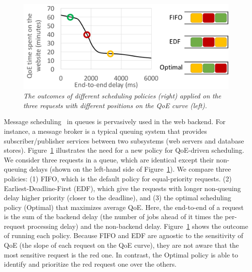 \begin{figure}
	\centering
	\includegraphics[width=1.0\textwidth]{figs/scheduling.pdf}
	\vspace{-0.6cm}
	\caption{\em The outcomes of different scheduling policies (right) applied on the three requests with different positions on the QoE curve (left).}
	\label{fig:scheduling}
\end{figure}
Message scheduling~\cite{rabbitmq,kafka} in queues is pervasively used in the web backend. 
For instance, a message broker is a typical queuing system that provides subscriber/publisher services between two subsystems (\eg web servers and database stores). 
Figure~\ref{fig:scheduling} illustrates the need for a new policy for QoE-driven scheduling. 
We consider three requests in a queue, which are identical except their non-queuing delays (shown on the left-hand side of Figure~\ref{fig:scheduling}).
We compare three policies: 
(1) FIFO, which is the default policy for equal-priority requests.
(2) Earliest-Deadline-First (EDF), which give the requests with longer non-queuing delay higher priority (\ie closer to the deadline), and 
(3) the optimal scheduling policy (Optimal) that maximizes average QoE.
Here, the end-to-end of a request is the sum of the backend delay (\ie the number of jobs ahead of it times the per-request processing delay) and the non-backend delay.
Figure~\ref{fig:scheduling}  shows the outcome of running each policy. 
Because FIFO and EDF are agnostic to the sensitivity of QoE (\ie the slope of each request on the QoE curve), they are not aware that the most sensitive request is the red one.
In contrast, the Optimal policy is able to identify and prioritize the red request one over the others.

